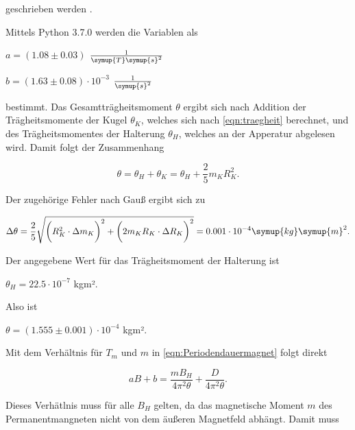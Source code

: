 geschrieben werden \cite[14]{fehlerrechnung}.

Mittels Python 3.7.0 werden die Variablen als

\vspace{.5em}
\centerline{$a = (1.08 \pm 0.03)$ $\frac{1}{\symup{T} \symup{s}^2}$}

\centerline{$b = (1.63 \pm 0.08) \cdot 10^{-3}$ $\frac{1}{\symup{s}^2}$}
\vspace{.5em}

bestimmt. Das Gesamtträgheitsmoment $\theta$ ergibt sich nach Addition der Trägheitsmomente der Kugel $\theta_K$, welches sich nach \eqref{eqn:traegheit} berechnet, und des Trägheitsmomentes der Halterung $\theta_H$, welches an der Apperatur abgelesen wird.
Damit folgt der Zusammenhang

\begin{equation}
  \theta = \theta_H + \theta_K = \theta_H + \frac {2}{5} m_K R_K^{2}.
\end{equation}

Der zugehörige Fehler nach Gauß ergibt sich zu

\begin{equation}
  \Delta \theta = \frac{2}{5} \sqrt{ \bigg( R_K^2 \cdot \Delta m_K \bigg)^2 + \bigg( 2m_K R_K \cdot \Delta R_K \bigg)^2 } = 0.001 \cdot 10^{-4} \symup{kg} \symup{m}^2.
\end{equation}

Der angegebene Wert für das Trägheitsmoment der Halterung ist

\vspace{.5em}
\centerline{$\theta_H = 22.5 \cdot 10^{-7}$ kgm².}
\vspace{.5em}

Also ist

\vspace{.5em}
\centerline{$\theta = (1.555 \pm 0.001) \cdot 10^{-4}$ kgm².}
\vspace{.5em}

Mit dem Verhältnis für $T_m$ und $m$ in \eqref{eqn:Periodendauermagnet} folgt direkt

\begin{equation}
  aB + b = \frac{mB_H}{4 \pi^2 \theta} + \frac{D}{4 \pi^2 \theta}.
\end{equation}

Dieses Verhätlnis muss für alle $B_H$ gelten, da das magnetische Moment $m$ des Permanentmangneten nicht von dem äußeren Magnetfeld abhängt.
Damit muss

